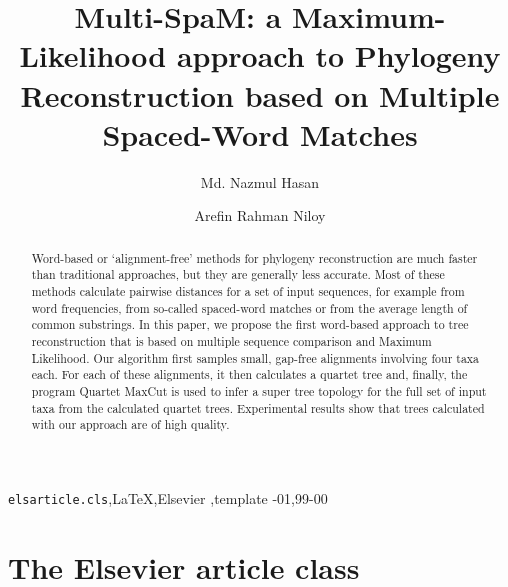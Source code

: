 \documentclass[review]{elsarticle}
\begin{document}
\begin{frontmatter}

\title{Multi-SpaM: a Maximum-Likelihood approach to Phylogeny Reconstruction based on Multiple Spaced-Word Matches}

\author{Md. Nazmul Hasan }

\author{Arefin Rahman Niloy}

\begin{abstract}
Word-based or ‘alignment-free’ methods for phylogeny reconstruction are much faster than traditional approaches, but they are generally less accurate. Most of these methods calculate
pairwise distances for a set of input sequences, for example from word
frequencies, from so-called spaced-word matches or from the average
length of common substrings. In this paper, we propose the first word-based approach
to tree reconstruction that is based on multiple sequence comparison
and Maximum Likelihood. Our algorithm first samples small, gap-free
alignments involving four taxa each. For each of these alignments, it 
 then calculates a quartet tree and, finally, the program Quartet MaxCut is used to infer a super tree topology for the full set of input taxa
from the calculated quartet trees. Experimental results show that
trees calculated with our approach are of high quality.
\end{abstract}

\begin{keyword}
\texttt{elsarticle.cls}\sep \LaTeX\sep Elsevier \sep template
-01\sep  99-00
\end{keyword}

\end{frontmatter}

\linenumbers

\section{The Elsevier article class}
\end{document}
